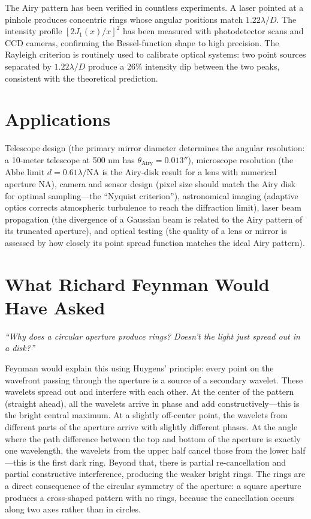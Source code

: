 \documentclass[11pt,openright]{book}
\begin{document}
The Airy pattern has been verified in countless experiments. A laser pointed at a pinhole produces concentric rings whose angular positions match $1.22\lambda/D$. The intensity profile $[2J_1(x)/x]^2$ has been measured with photodetector scans and CCD cameras, confirming the Bessel-function shape to high precision. The Rayleigh criterion is routinely used to calibrate optical systems: two point sources separated by $1.22\lambda/D$ produce a 26\% intensity dip between the two peaks, consistent with the theoretical prediction.
\section*{Applications}

Telescope design (the primary mirror diameter determines the angular resolution: a 10-meter telescope at 500 nm has $\theta_{\text{Airy}} = 0.013''$), microscope resolution (the Abbe limit $d = 0.61\lambda/\text{NA}$ is the Airy-disk result for a lens with numerical aperture NA), camera and sensor design (pixel size should match the Airy disk for optimal sampling---the ``Nyquist criterion''), astronomical imaging (adaptive optics corrects atmospheric turbulence to reach the diffraction limit), laser beam propagation (the divergence of a Gaussian beam is related to the Airy pattern of its truncated aperture), and optical testing (the quality of a lens or mirror is assessed by how closely its point spread function matches the ideal Airy pattern).
\section*{What Richard Feynman Would Have Asked}

\textit{``Why does a circular aperture produce rings? Doesn't the light just spread out in a disk?''}

Feynman would explain this using Huygens' principle: every point on the wavefront passing through the aperture is a source of a secondary wavelet. These wavelets spread out and interfere with each other. At the center of the pattern (straight ahead), all the wavelets arrive in phase and add constructively---this is the bright central maximum. At a slightly off-center point, the wavelets from different parts of the aperture arrive with slightly different phases. At the angle where the path difference between the top and bottom of the aperture is exactly one wavelength, the wavelets from the upper half cancel those from the lower half---this is the first dark ring. Beyond that, there is partial re-cancellation and partial constructive interference, producing the weaker bright rings. The rings are a direct consequence of the circular symmetry of the aperture: a square aperture produces a cross-shaped pattern with no rings, because the cancellation occurs along two axes rather than in circles.
\end{document}
